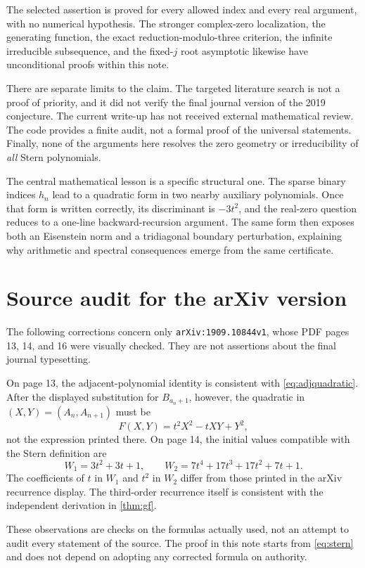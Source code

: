 \documentclass[11pt]{article}
\numberwithin{equation}{section}
\theoremstyle{definition}
\begin{document}
The selected assertion is proved for every allowed index and every real
argument, with no numerical hypothesis.  The stronger complex-zero
localization, the generating function, the exact reduction-modulo-three
criterion, the infinite irreducible subsequence, and the fixed-$j$ root
asymptotic likewise have unconditional proofs within this note.

There are separate limits to the claim.  The targeted literature search is
not a proof of priority, and it did not verify the final journal version
of the 2019 conjecture.  The current write-up has not received external
mathematical review.  The code provides a finite audit, not a formal proof
of the universal statements.  Finally, none of the arguments here resolves
the zero geometry or irreducibility of \emph{all} Stern polynomials.

The central mathematical lesson is a specific structural one.  The sparse
binary indices $h_n$ lead to a quadratic form in two nearby auxiliary
polynomials.  Once that form is written correctly, its discriminant is
$-3t^2$, and the real-zero question reduces to a one-line backward-recursion
argument.  The same form then exposes both an Eisenstein norm and a
tridiagonal boundary perturbation, explaining why arithmetic and spectral
consequences emerge from the same certificate.

\appendix
\section{Source audit for the arXiv version}\label{sec:audit}

The following corrections concern only \texttt{arXiv:1909.10844v1}, whose
PDF pages 13, 14, and 16 were visually checked.  They are not assertions
about the final journal typesetting.

On page 13, the adjacent-polynomial identity is consistent with
\eqref{eq:adjquadratic}.  After the displayed substitution for
$B_{a_n+1}$, however, the quadratic in $(X,Y)=(A_n,A_{n+1})$ must be
\[
 F(X,Y)=t^2X^2-tXY+Y^2,
\]
not the expression printed there.
On page 14, the initial values compatible with the Stern definition are
\[
 W_1=3t^2+3t+1,\qquad
 W_2=7t^4+17t^3+17t^2+7t+1.
\]
The coefficients of $t$ in $W_1$ and $t^2$ in $W_2$ differ from those
printed in the arXiv recurrence display.  The third-order recurrence itself
is consistent with the independent derivation in \cref{thm:gf}.

These observations are checks on the formulas actually used, not an attempt
to audit every statement of the source.  The proof in this note starts from
\eqref{eq:stern} and does not depend on adopting any corrected formula
on authority.
\end{document}
